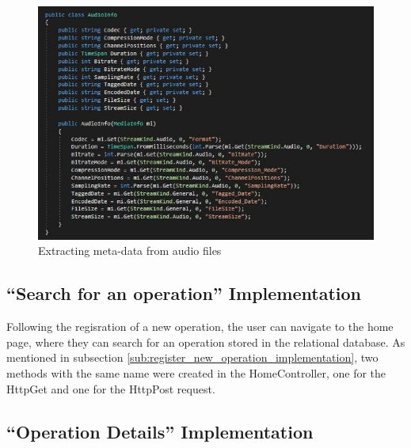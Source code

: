 \begin{figure}[!ht]
\begin{center}
\includegraphics[width=17cm]{imgs/audio_extracting.jpg}
\end{center}\vspace{-0.3cm}
\caption[Extracting meta-data from audio files]{Extracting meta-data from audio files} \label{audio_extracting}
\end{figure}




\subsection{``Search for an operation'' Implementation}
\label{sub:search_for_an_operation_implementation}

Following the regisration of a new operation, the user can navigate to the home page, where they can search for an operation stored in the relational database. As mentioned in subsection \ref{sub:register_new_operation_implementation}, two methods with the same name were created in the HomeController, one for the HttpGet and one for the HttpPost request.


\subsection{``Operation Details'' Implementation}
\label{sub:operation_details_implentation}



\blindtext

\blindtext

\blindtext


